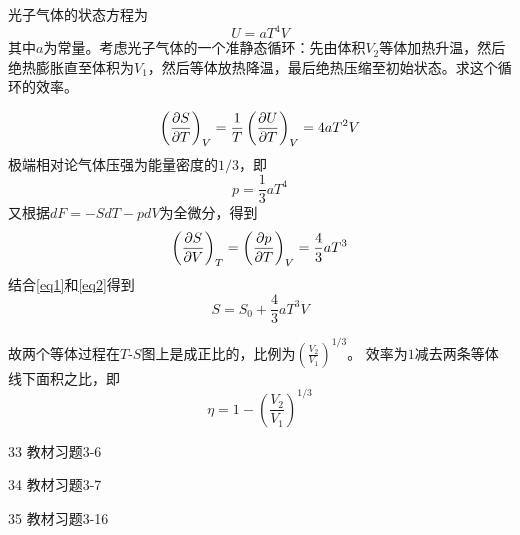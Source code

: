 \documentclass[CJK]{beamer}
\begin{document}
\begin{frame}
  \chtitle{\proid (\sfour)}
  \bch
  光子气体的状态方程为
  $$ U = a T^4 V$$
  其中$a$为常量。考虑光子气体的一个准静态循环：先由体积$V_2$等体加热升温，然后绝热膨胀直至体积为$V_1$，然后等体放热降温，最后绝热压缩至初始状态。求这个循环的效率。
  \ech
\end{frame}


\begin{frame}
  \bch
  {\scriptsize

\begin{equation}
    \left(\frac{\partial S}{\partial T}\right)_{V} = \frac{1}{T}\left(\frac{\partial U}{\partial T}\right)_{V} = 4aT^2 V \label{eq1}
\end{equation}
极端相对论气体压强为能量密度的$1/3$，即
$$p = \frac{1}{3}aT^4$$
又根据$ dF = -SdT - pdV$为全微分，得到
\begin{equation}
  \left(\frac{\partial S}{\partial V}\right)_{T} = \left(\frac{\partial p}{\partial T}\right)_{V} = \frac{4}{3}aT^3 \label{eq2}
\end{equation}
  结合\eqref{eq1}和\eqref{eq2}得到
  $$ S = S_0 + \frac{4}{3} aT^3 V $$
  
  故两个等体过程在$T$-$S$图上是成正比的，比例为$\left(\frac{V_2}{V_1}\right)^{1/3}$。
  效率为$1$减去两条等体线下面积之比，即
  $$\eta = 1 - \left(\frac{V_2}{V_1}\right)^{1/3}$$
  }
  \ech
\end{frame}


\begin{frame}
  \bch
  \bitem
  \item[33]{教材习题3-6}
  \item[34]{教材习题3-7}
  \item[35]{教材习题3-16}
  \eitem
  \ech
\end{frame}
\end{document}
